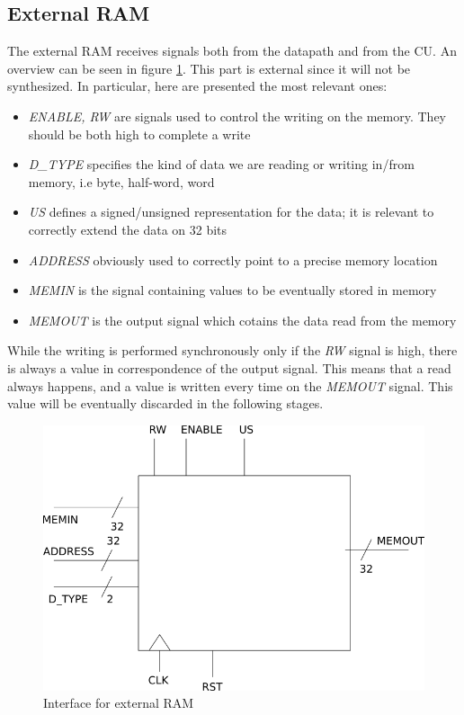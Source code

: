 \subsection{External RAM}
\label{ram}
The external RAM receives signals both from the datapath and from the CU. An overview can be seen in figure \ref{ext_ram_fig}. This part is external since it will not be synthesized. In particular, here are presented the most relevant ones:
\begin{itemize}
	\item \textit{ENABLE, RW} are signals used to control the writing on the memory. They should be both high to complete a write
	\item \textit{D\_TYPE} specifies the kind of data we are reading or writing in/from memory, i.e byte, half-word, word
	\item \textit{US} defines a signed/unsigned representation for the data; it is relevant to correctly extend the data on 32 bits
	\item \textit{ADDRESS} obviously used to correctly point to a precise memory location
	\item \textit{MEMIN} is the signal containing values to be eventually stored in memory
	\item \textit{MEMOUT} is the output signal which cotains the data read from the memory
\end{itemize}

While the writing is performed synchronously only if the \textit{RW} signal is high, there is always a value in correspondence of the output signal. This means that a read always happens, and a value is written every time on the \textit{MEMOUT} signal. This value will be eventually discarded in the following stages.

\begin{figure}
	\centering
	\includegraphics[scale=0.5]{chapters/figures/ram_ext}
	\caption{Interface for external RAM}
	\label{ext_ram_fig}
\end{figure} 
